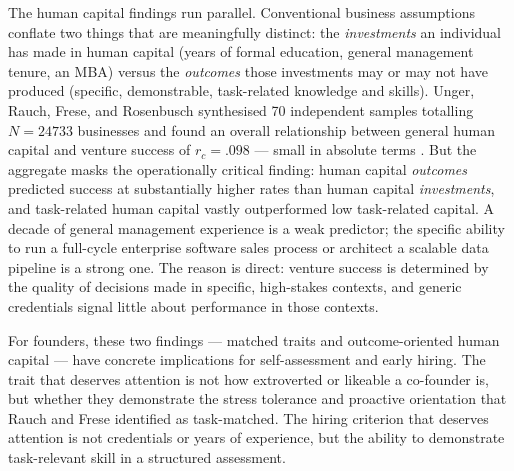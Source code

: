 The human capital findings run parallel. Conventional business assumptions conflate two things
that are meaningfully distinct: the \emph{investments} an individual has made in human capital
(years of formal education, general management tenure, an MBA) versus the \emph{outcomes} those
investments may or may not have produced (specific, demonstrable, task-related knowledge and
skills). Unger, Rauch, Frese, and Rosenbusch synthesised \num{70} independent samples totalling
$N = \num{24733}$ businesses and found an overall relationship between general human capital and
venture success of $r_c = .098$ --- small in absolute terms
\parencite{unger2011human}. %
But the aggregate masks the operationally critical finding: human capital \emph{outcomes}
predicted success at substantially higher rates than human capital \emph{investments}, and
task-related human capital vastly outperformed low task-related capital. A decade of general
management experience is a weak predictor; the specific ability to run a full-cycle enterprise
software sales process or architect a scalable data pipeline is a strong one. The reason is
direct: venture success is determined by the quality of decisions made in specific, high-stakes
contexts, and generic credentials signal little about performance in those contexts.

For founders, these two findings --- matched traits and outcome-oriented human capital --- have
concrete implications for self-assessment and early hiring. The trait that deserves attention is
not how extroverted or likeable a co-founder is, but whether they demonstrate the stress
tolerance and proactive orientation that Rauch and Frese identified as task-matched. The hiring
criterion that deserves attention is not credentials or years of experience, but the ability to
demonstrate task-relevant skill in a structured assessment.

